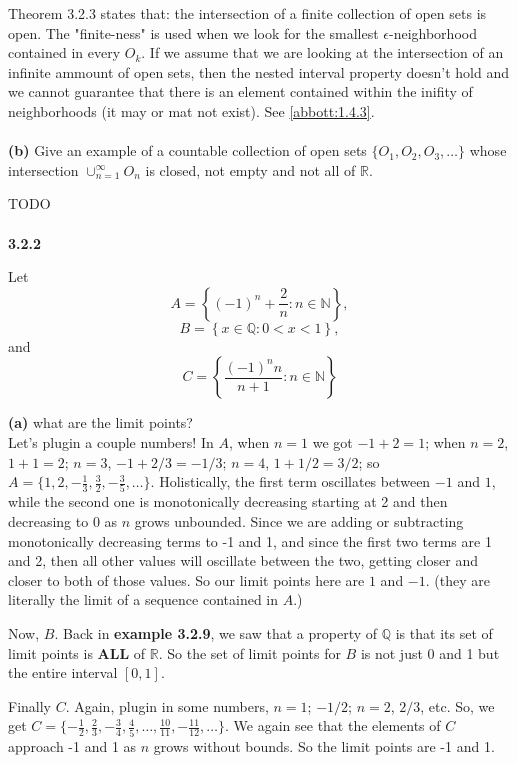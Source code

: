 Theorem 3.2.3 states that: the intersection of a finite collection of open sets is open.
The "finite-ness" is used when we look for the smallest $\epsilon$-neighborhood contained in every $O_k$.
If we assume that we are looking at the intersection of an infinite ammount of open sets, then the nested interval
property doesn't hold and we cannot guarantee that there is an element contained within the inifity of neighborhoods (it may or mat not exist).
See \ref{abbott:1.4.3}.
\\~\\

\textbf{(b)} Give an example of a countable collection of open sets $\{O_1, O_2, O_3, \ldots\}$
whose intersection $\cup^{\infty}_{n=1} O_n$ is closed, not empty and not all of $\mathbb{R}$.

TODO
\\~\\


\textbf{3.2.2}

Let
$$
A = \left\{ (-1)^n + \frac{2}{n} : n\in\mathbb{N} \right\},
$$
$$
B = \left\{ x \in\mathbb{Q} : 0 < x < 1 \right\},
$$
and
$$
C = \left\{ \frac{(-1)^n n}{n+1} : n\in\mathbb{N} \right\}
$$

\textbf{(a)} what are the limit points?
\\

Let's plugin a couple numbers!
In $A$, when $n=1$ we got $-1 + 2 = 1$; when $n=2$, $1 + 1 = 2$; $n=3$, $-1 + 2/3 = -1/3$; $n=4$, $1 + 1/2 = 3/2$;
so $A = \{ 1, 2, -\frac{1}{3}, \frac{3}{2}, -\frac{3}{5}, \ldots \}$.
Holistically, the first term oscillates between $-1$ and $1$, while the second one is monotonically decreasing
starting at 2 and then decreasing to 0 as $n$ grows unbounded.
Since we are adding or subtracting monotonically decreasing terms to -1 and 1, and since the first two terms are 1 and 2,
then all other values will oscillate between the two, getting closer and closer to both of those values.
So our limit points here are $1$ and $-1$. (they are literally the limit of a sequence contained in $A$.)

Now, $B$.
Back in \textbf{example 3.2.9}, we saw that a property of $\mathbb{Q}$ is that its set of limit points is \textbf{ALL}
of $\mathbb{R}$.
So the set of limit points for $B$ is not just 0 and 1 but the entire interval $[0,1]$.

Finally $C$. Again, plugin in some numbers, $n=1$; $-1/2$; $n=2$, $2/3$, etc.
So, we get $C = \{-\frac{1}{2}, \frac{2}{3}, -\frac{3}{4}, \frac{4}{5}, \ldots, \frac{10}{11}, -\frac{11}{12}, \ldots \}$.
We again see that the elements of $C$ approach -1 and 1 as $n$ grows without bounds.
So the limit points are -1 and 1.

